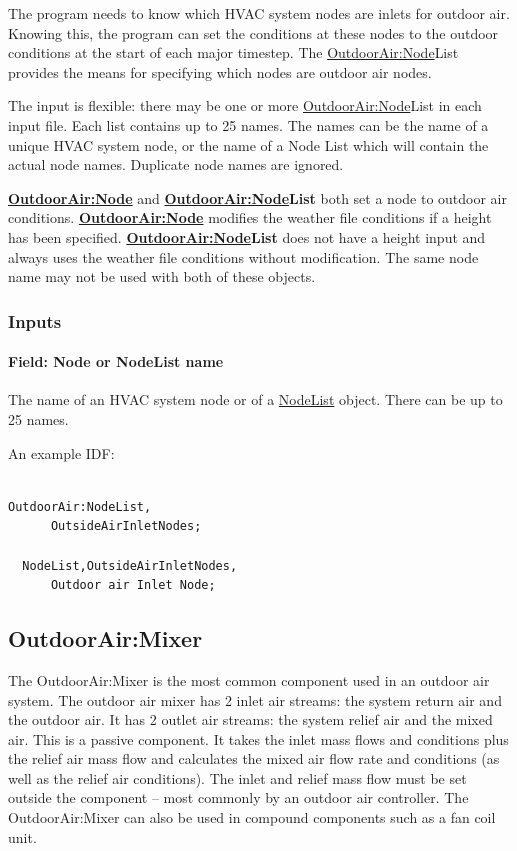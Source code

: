 The program needs to know which HVAC system nodes are inlets for outdoor air. Knowing this, the program can set the conditions at these nodes to the outdoor conditions at the start of each major timestep. The \hyperref[outdoorairnode]{OutdoorAir:Node}List provides the means for specifying which nodes are outdoor air nodes.

The input is flexible: there may be one or more \hyperref[outdoorairnode]{OutdoorAir:Node}List in each input file. Each list contains up to 25 names. The names can be the name of a unique HVAC system node, or the name of a Node List which will contain the actual node names. Duplicate node names are ignored.

\textbf{\hyperref[outdoorairnode]{OutdoorAir:Node}} and \textbf{\hyperref[outdoorairnode]{OutdoorAir:Node}List} both set a node to outdoor air conditions. \textbf{\hyperref[outdoorairnode]{OutdoorAir:Node}} modifies the weather file conditions if a height has been specified. \textbf{\hyperref[outdoorairnode]{OutdoorAir:Node}List} does not have a height input and always uses the weather file conditions without modification. The same node name may not be used with both of these objects.

\subsubsection{Inputs}\label{inputs-6-001}

\paragraph{Field: Node or NodeList name}\label{field-node-or-nodelist-name}

The name of an HVAC system node or of a \hyperref[nodelist]{NodeList} object. There can be up to 25 names.

An example IDF:

\begin{lstlisting}

OutdoorAir:NodeList,
      OutsideAirInletNodes;

  NodeList,OutsideAirInletNodes,
      Outdoor air Inlet Node;
\end{lstlisting}

\subsection{OutdoorAir:Mixer}\label{outdoorairmixer}

The OutdoorAir:Mixer is the most common component used in an outdoor air system. The outdoor air mixer has 2 inlet air streams: the system return air and the outdoor air. It has 2 outlet air streams: the system relief air and the mixed air. This is a passive component. It takes the inlet mass flows and conditions plus the relief air mass flow and calculates the mixed air flow rate and conditions (as well as the relief air conditions). The inlet and relief mass flow must be set outside the component -- most commonly by an outdoor air controller. The OutdoorAir:Mixer can also be used in compound components such as a fan coil unit.

